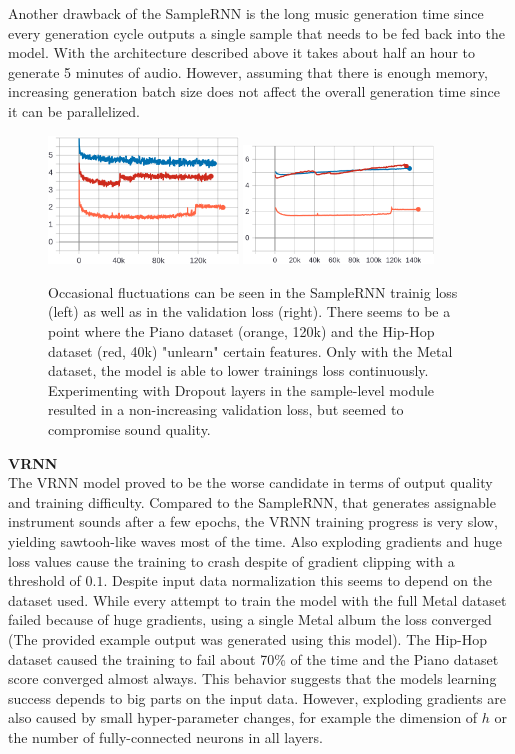 \documentclass[12pt]{article}
\begin{document}
Another drawback of the SampleRNN is the long music generation time since every generation cycle outputs a single sample that needs to be fed back into the model.
With the architecture described above it takes about half an hour to generate 5 minutes of audio.
However, assuming that there is enough memory, increasing generation batch size does not affect the overall generation time since it can be parallelized.
\begin{figure}
\includegraphics[width=0.45\textwidth]{img/sample-rnn-train.png}
\includegraphics[width=0.45\textwidth]{img/sample-rnn-val.png}
\caption{Occasional fluctuations can be seen in the SampleRNN trainig loss (left) as well as in the validation loss (right). There seems to be a point where the Piano dataset (orange, 120k) and the Hip-Hop dataset (red, 40k) "unlearn" certain features. Only with the Metal dataset, the model is able to lower trainings loss continuously. Experimenting with Dropout layers in the sample-level module resulted in a non-increasing validation loss, but seemed to compromise sound quality.}
\label{fig:samplernn-eval}
\end{figure}




\textbf{VRNN}\\
The VRNN model proved to be the worse candidate in terms of output quality and training difficulty.
Compared to the SampleRNN, that generates assignable instrument sounds after a few epochs, the VRNN training progress is very slow, yielding sawtooh-like waves most of the time.
Also exploding gradients and huge loss values cause the training to crash despite of gradient clipping with a threshold of $0.1$.
Despite input data normalization this seems to depend on the dataset used.
While every attempt to train the model with the full Metal dataset failed because of huge gradients, using a single Metal album the loss converged (The provided example output was generated using this model).
The Hip-Hop dataset caused the training to fail about 70\% of the time and the Piano dataset score converged almost always.
This behavior suggests that the models learning success depends to big parts on the input data.
However, exploding gradients are also caused by small hyper-parameter changes, for example the dimension of $h$ or the number of fully-connected neurons in all layers.
\end{document}
